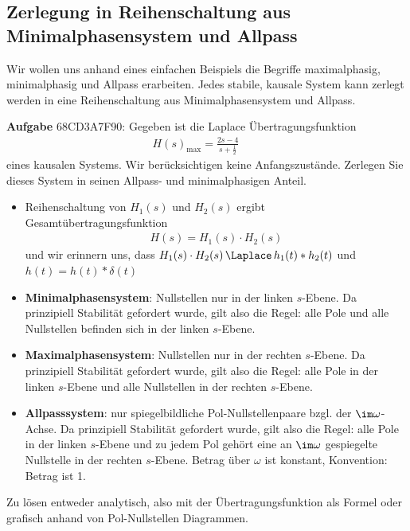 \subsection{Zerlegung in Reihenschaltung aus Minimalphasensystem und Allpass}
\label{sec:68CD3A7F90}
\begin{Ziel}
Wir wollen uns anhand eines
einfachen Beispiels die Begriffe maximalphasig, minimalphasig und Allpass erarbeiten.
Jedes stabile, kausale System kann zerlegt werden in eine Reihenschaltung aus
Minimalphasensystem und Allpass.
\end{Ziel}
\textbf{Aufgabe} {\tiny 68CD3A7F90}: Gegeben ist die Laplace
Übertragungsfunktion
\begin{align}
H(s)_\mathrm{max} = \frac{2 s-4}{s+\frac{1}{2}}\qquad
\end{align}
eines kausalen Systems. Wir berücksichtigen keine Anfangszustände.
Zerlegen Sie dieses System in seinen Allpass- und minimalphasigen Anteil.





\begin{Werkzeug}
\begin{itemize}
  \item Reihenschaltung von $H_1(s)$ und $H_2(s)$ ergibt Gesamtübertragungsfunktion
  \begin{align}
    H(s) = H_1(s) \cdot H_2(s)
  \end{align}
  und wir erinnern uns, dass $H_1(s)\cdot H_2(s) \,\Laplace\, h_1(t)\ast h_2(t)$
  und $h(t) = h(t)\ast \delta(t)$
  \item \textbf{Minimalphasensystem}: Nullstellen nur in der linken $s$-Ebene. Da prinzipiell
  Stabilität gefordert wurde, gilt also die Regel: alle Pole und alle Nullstellen
  befinden sich in der linken $s$-Ebene.
  \item \textbf{Maximalphasensystem}: Nullstellen nur in der rechten $s$-Ebene. Da prinzipiell
  Stabilität gefordert wurde, gilt also die Regel: alle Pole in der linken
  $s$-Ebene und alle Nullstellen in der rechten $s$-Ebene.
  \item \textbf{Allpasssystem}: nur spiegelbildliche Pol-Nullstellenpaare bzgl.
  der $\im\omega$-Achse. Da prinzipiell Stabilität gefordert wurde, gilt also
  die Regel: alle Pole in der linken $s$-Ebene und zu jedem Pol gehört
  eine an $\im\omega$ gespiegelte Nullstelle in der rechten $s$-Ebene.
  Betrag über $\omega$ ist konstant, Konvention: Betrag ist 1.
\end{itemize}


\end{Werkzeug}
\begin{Ansatz}
Zu lösen entweder analytisch, also mit der Übertragungsfunktion als Formel
oder grafisch anhand von Pol-Nullstellen Diagrammen.
\end{Ansatz}

